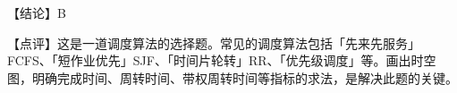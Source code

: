 \documentclass[UTF8]{ctexart}
\begin{document}
\BgThispage
\vspace{1em}

{\color{cyan!80!black}
【结论】B

【点评】这是一道调度算法的选择题。常见的调度算法包括「先来先服务」FCFS、「短作业优先」SJF、「时间片轮转」RR、「优先级调度」等。画出时空图，明确完成时间、周转时间、带权周转时间等指标的求法，是解决此题的关键。
}
\end{document}
